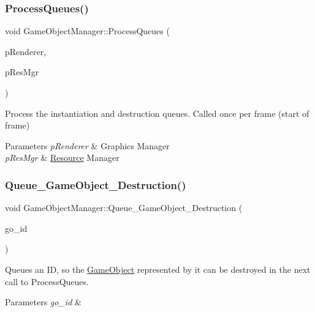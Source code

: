 \subsubsection{\texorpdfstring{Process\+Queues()}{ProcessQueues()}}
{\footnotesize\ttfamily void Game\+Object\+Manager\+::\+Process\+Queues (\begin{DoxyParamCaption}\item[{\hyperlink{classAppRenderer}{App\+Renderer} $\ast$}]{p\+Renderer,  }\item[{\hyperlink{classResourceManager}{Resource\+Manager} $\ast$}]{p\+Res\+Mgr }\end{DoxyParamCaption})}



Process the instantiation and destruction queues. Called once per frame (start of frame) 


\begin{DoxyParams}{Parameters}
{\em p\+Renderer} & Graphics Manager \\
\hline
{\em p\+Res\+Mgr} & \hyperlink{structResource}{Resource} Manager \\
\hline
\end{DoxyParams}
\mbox{\label{classGameObjectManager_a79fb81780af71ad130541f47dc281a4c}} 
\subsubsection{\texorpdfstring{Queue\+\_\+\+Game\+Object\+\_\+\+Destruction()}{Queue\_GameObject\_Destruction()}}
{\footnotesize\ttfamily void Game\+Object\+Manager\+::\+Queue\+\_\+\+Game\+Object\+\_\+\+Destruction (\begin{DoxyParamCaption}\item[{size\+\_\+t}]{go\+\_\+id }\end{DoxyParamCaption})}



Queues an ID, so the \hyperlink{classGameObject}{Game\+Object} represented by it can be destroyed in the next call to Process\+Queues. 


\begin{DoxyParams}{Parameters}
{\em go\+\_\+id} & \\
\hline
\end{DoxyParams}
\mbox{\label{classGameObjectManager_ac6d00fb01e702114b16784cf71221798}} 
